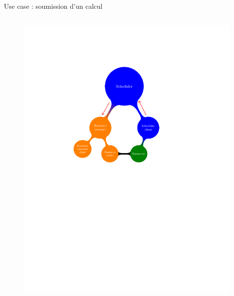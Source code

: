 \documentclass{beamer}
\begin{document}
\begin{frame}{Use case : soumission d'un calcul}
\begin{columns}
\begin{column}[l]{0.5\linewidth}
{\begin{figure}
            \includegraphics[trim=5.5cm 14.3cm 2cm 6.3cm,scale=0.69]{submit.pdf}
        \end{figure}}
\end{column}
\end{columns}
\end{frame}
\end{document}
